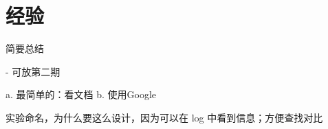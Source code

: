 \documentclass[../main.tex]{subfiles}
\begin{document}
\chapter{经验}
\vspace{-2cm}

简要总结

- 可放第二期


a. 最简单的：看文档
b. 使用Google

实验命名，为什么要这么设计，因为可以在 log 中看到信息；方便查找对比
\end{document}
